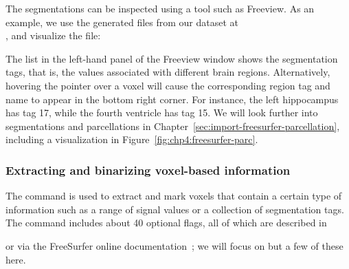 The segmentations can be inspected using a tool such as Freeview. As an
example, we use the \freesurfer{} generated files from our dataset at \\
, and visualize the  file:

\noindent The list in the left-hand panel of the Freeview window shows
the segmentation tags, that is, the values associated with different
brain regions. Alternatively, hovering the pointer over a voxel will
cause the corresponding region tag and name to appear in the bottom
right corner. For instance, the left hippocampus has tag 17, while the
fourth ventricle has tag 15. We will look further into segmentations
and parcellations in Chapter~\ref{sec:import-freesurfer-parcellation},
including a visualization in Figure~\ref{fig:chp4:freesurfer-parc}.

\subsubsection*{Extracting and binarizing voxel-based information}
The {\freesurfer} command  is used to extract and
mark voxels that contain a certain type of information such as a range
of signal values or a collection of segmentation tags. The command
includes about 40 optional flags, all of which are described in

\noindent or via the FreeSurfer online
documentation~\cite{freesurfer-wiki}; we will focus on but a few of
these here.


